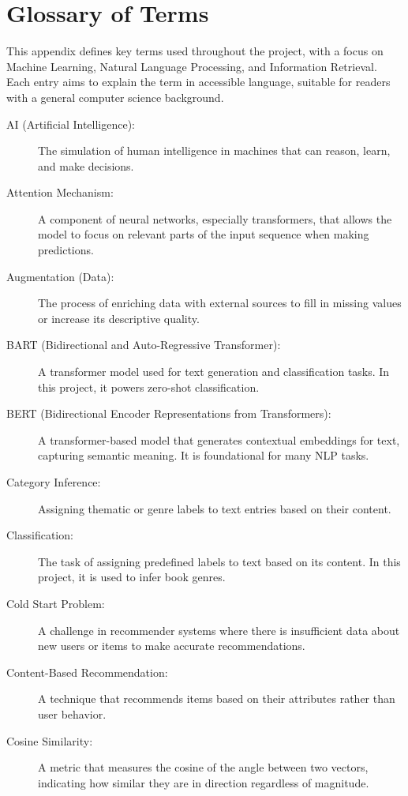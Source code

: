 \chapter{Glossary of Terms}
\label{appendix:glossary}

This appendix defines key terms used throughout the project, with a focus on Machine Learning, Natural Language Processing, and Information Retrieval. Each entry aims to explain the term in accessible language, suitable for readers with a general computer science background.

\begin{description}
    \item[AI (Artificial Intelligence):] The simulation of human intelligence in machines that can reason, learn, and make decisions.
    \item[Attention Mechanism:] A component of neural networks, especially transformers, that allows the model to focus on relevant parts of the input sequence when making predictions.
    \item[Augmentation (Data):] The process of enriching data with external sources to fill in missing values or increase its descriptive quality.
    \item[BART (Bidirectional and Auto-Regressive Transformer):] A transformer model used for text generation and classification tasks. In this project, it powers zero-shot classification.
    \item[BERT (Bidirectional Encoder Representations from Transformers):] A transformer-based model that generates contextual embeddings for text, capturing semantic meaning. It is foundational for many NLP tasks.
    \item[Category Inference:] Assigning thematic or genre labels to text entries based on their content.
    \item[Classification:] The task of assigning predefined labels to text based on its content. In this project, it is used to infer book genres.
    \item[Cold Start Problem:] A challenge in recommender systems where there is insufficient data about new users or items to make accurate recommendations.
    \item[Content-Based Recommendation:] A technique that recommends items based on their attributes rather than user behavior.
    \item[Cosine Similarity:] A metric that measures the cosine of the angle between two vectors, indicating how similar they are in direction regardless of magnitude.

\end{description}
